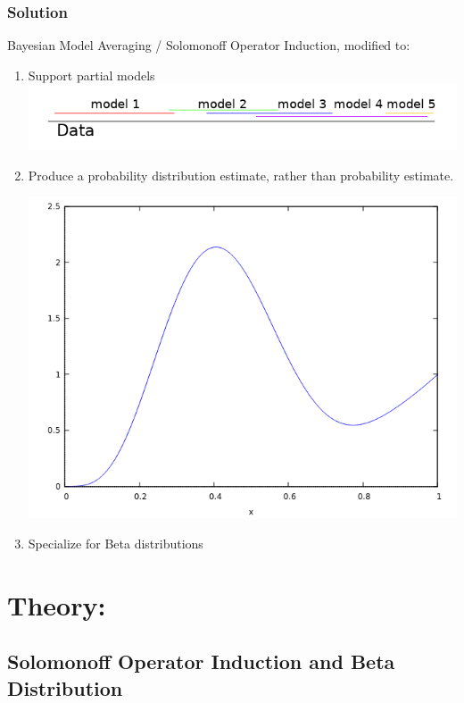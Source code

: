 \documentclass{beamer}
\begin{document}
\begin{frame}[fragile]
  \frametitle{Solution}

  Bayesian Model Averaging / Solomonoff Operator Induction,
  modified to:
  \begin{enumerate}
  \item Support partial models
    \includegraphics[scale=0.4]{images/data_line.png}
  \item Produce a probability distribution estimate, rather than
    probability estimate.
    \begin{center}\includegraphics[scale=0.2]{images/Beta_mixed_4_6_3_0_c_0_1_alpha.png}\end{center}
  \item Specialize for Beta distributions
  \end{enumerate}

\end{frame}

\section{Theory:}
\subsection{Solomonoff Operator Induction and Beta Distribution}
\end{document}
